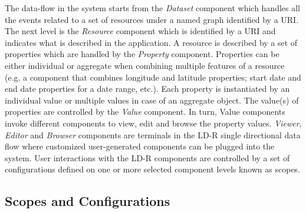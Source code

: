 \documentclass{llncs}
\begin{document}
The data-flow in the system starts from the \emph{Dataset} component which handles all the events related to a set of resources under a named graph identified by a URI.
The next level is the \emph{Resource} component which is identified by a URI and indicates what is described in the application.
A resource is described by a set of properties which are handled by the \emph{Property} component.
Properties can be either individual or aggregate when combining multiple features of a resource (e.g. a component that combines longitude and latitude properties; start date and end date properties for a date range, etc.).
Each property is instantiated by an individual value or multiple values in case of an aggregate object.
The value(s) of properties are controlled by the \emph{Value} component.
In turn, Value components invoke different components to view, edit and browse the property values.
\emph{Viewer}, \emph{Editor} and \emph{Browser} components are terminals in the LD-R single directional data flow where customized user-generated components can be plugged into the system.
User interactions with the LD-R components are controlled by a set of configurations defined on one or more selected component levels known as scopes.

\subsection{Scopes and Configurations}


\end{document}
